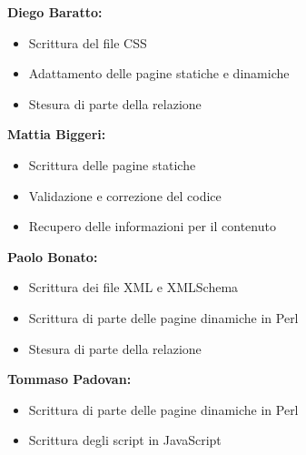\documentclass{article}
\begin{document}
	\textbf{Diego Baratto:}\\
	\begin{itemize}
	\item Scrittura del file CSS
	\item Adattamento delle pagine statiche e dinamiche
	\item Stesura di parte della relazione
	\end{itemize}
\textbf{Mattia Biggeri:}\\
	\begin{itemize}
	\item Scrittura delle pagine statiche
	\item Validazione e correzione del codice
	\item Recupero delle informazioni per il contenuto
	\end{itemize}
\textbf{Paolo Bonato:}\\
	\begin{itemize}
	\item Scrittura dei file XML e XMLSchema
	\item Scrittura di parte delle pagine dinamiche in Perl
	\item Stesura di parte della relazione
	\end{itemize}
\textbf{Tommaso Padovan:}\\
	\begin{itemize}
	\item Scrittura di parte delle pagine dinamiche in Perl
	\item Scrittura degli script in JavaScript
	\end{itemize}
\end{document}
